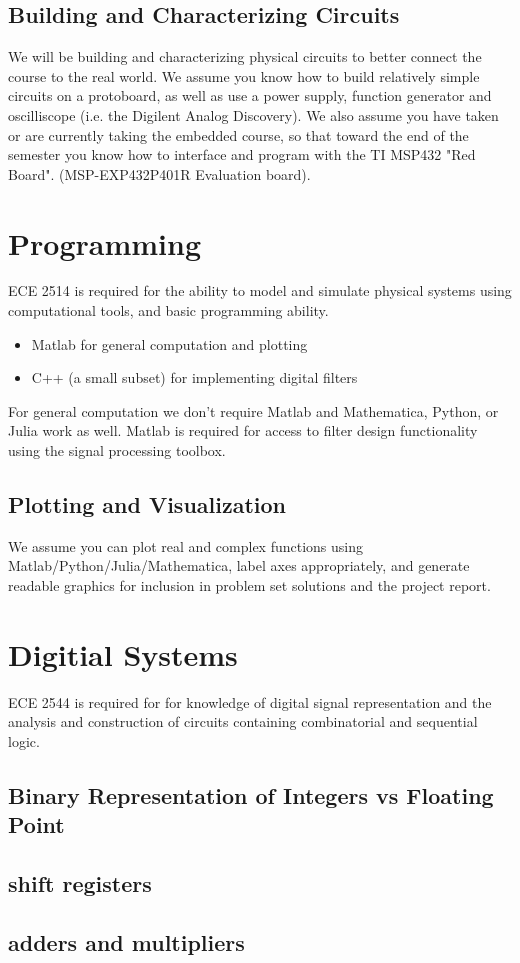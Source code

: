 \subsection*{Building and Characterizing Circuits}

We will be building and characterizing physical circuits to better connect the course to the real world. We assume you know how to build relatively simple circuits on a protoboard, as well as use a power supply, function generator and oscilliscope (i.e. the Digilent Analog Discovery). We also assume you have taken or are currently taking the embedded course, so that toward the end of the semester you know how to interface and program with the TI MSP432 "Red Board".
(MSP-EXP432P401R Evaluation board).

\section{Programming}

ECE 2514 is required for the ability to model and simulate physical systems using computational tools, and basic programming ability.

\begin{itemize}
\item Matlab for general computation and plotting
\item C++ (a small subset) for implementing digital filters
\end{itemize}

For general computation we don't require Matlab and Mathematica, Python, or Julia work as well. Matlab is required for access to filter design functionality using the signal processing toolbox. 

\subsection*{Plotting and Visualization}

We assume you can plot real and complex functions using Matlab/Python/Julia/Mathematica, label axes appropriately, and generate readable graphics for inclusion in problem set solutions and the project report.

\section{Digitial Systems}

ECE 2544 is required for for knowledge of digital signal representation and the analysis and construction of circuits containing combinatorial and sequential logic.

\subsection*{Binary Representation of Integers vs Floating Point}

\subsection*{shift registers}

\subsection*{adders and multipliers}
